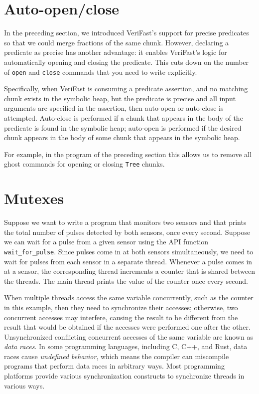 \documentclass{article}
\begin{document}
\section{Auto-open/close}\label{section:auto-open-close}

In the preceding section, we introduced VeriFast's support for
precise predicates so that we could merge fractions of the same
chunk. However, declaring a predicate as precise has another
advantage: it enables VeriFast's logic for automatically
opening and closing the predicate. This cuts down on the number
of \lstinline|open| and \lstinline|close| commands that you
need to write explicitly.

Specifically, when VeriFast is consuming a predicate assertion,
and no matching chunk exists in the symbolic heap, but the
predicate is precise and all input arguments are specified in
the assertion, then auto-open or auto-close is attempted.
Auto-close is performed if a chunk that appears in the body of
the predicate is found in the symbolic heap; auto-open is
performed if the desired chunk appears in the body of some
chunk that appears in the symbolic heap.

For example, in the program of the preceding section this
allows us to remove all ghost commands for opening or closing
\lstinline|Tree| chunks.

\section{Mutexes}\label{section:mutexes}

Suppose we want to write a program that monitors two sensors
and that prints the total number of pulses detected by both
sensors, once every second. Suppose we can wait for a pulse from a
given sensor using the API function \lstinline!wait_for_pulse!.
Since pulses come in at both sensors simultaneously, we need to
wait for pulses from each sensor in a separate thread. Whenever
a pulse comes in at a sensor, the corresponding thread
increments a counter that is shared between the threads. The
main thread prints the value of the counter once every second.

When multiple threads access the same variable concurrently,
such as the counter in this example, then they need to
synchronize their accesses; otherwise, two concurrent accesses
may interfere, causing the result to be different from the
result that would be obtained if the accesses were performed
one after the other. Unsynchronized conflicting concurrent accesses
of the same variable are known as \emph{data races}. In some programming languages,
including C, C{+}{+}, and Rust, data races cause \emph{undefined behavior},
which means the compiler can miscompile programs that perform data races
in arbitrary ways.
Most programming platforms provide various
synchronization constructs to synchronize threads in various
ways.
\end{document}
